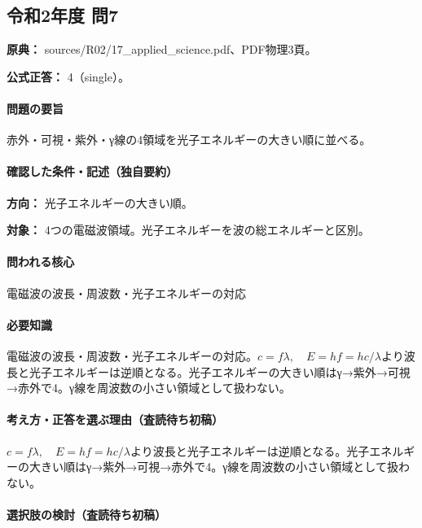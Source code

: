 \subsection{令和2年度 問7}
\label{q:r02-reg-applied-07}

\noindent\textbf{原典：} sources/R02/17\_applied\_science.pdf、PDF物理3頁。

\textbf{公式正答：} 4（single）。

\paragraph{問題の要旨} 赤外・可視・紫外・γ線の4領域を光子エネルギーの大きい順に並べる。

\paragraph{確認した条件・記述（独自要約）}\mbox{}\par

\noindent\textbf{方向：} 光子エネルギーの大きい順。\par

\noindent\textbf{対象：} 4つの電磁波領域。光子エネルギーを波の総エネルギーと区別。\par

\paragraph{問われる核心} 電磁波の波長・周波数・光子エネルギーの対応

\paragraph{必要知識} 電磁波の波長・周波数・光子エネルギーの対応。\(c=f\lambda,\quad E=hf=hc/\lambda\)より波長と光子エネルギーは逆順となる。光子エネルギーの大きい順はγ→紫外→可視→赤外で4。γ線を周波数の小さい領域として扱わない。

\paragraph{考え方・正答を選ぶ理由（査読待ち初稿）} \(c=f\lambda,\quad E=hf=hc/\lambda\)より波長と光子エネルギーは逆順となる。光子エネルギーの大きい順はγ→紫外→可視→赤外で4。γ線を周波数の小さい領域として扱わない。

\paragraph{選択肢の検討（査読待ち初稿）}\mbox{}\par

